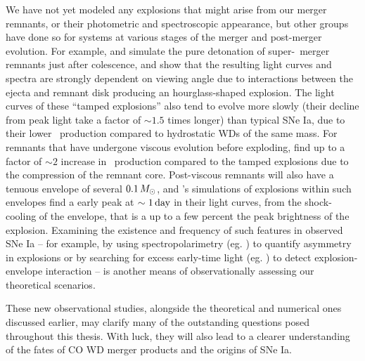 We have not yet modeled any explosions that might arise from our merger remnants, or their photometric and spectroscopic appearance, but other groups have done so for systems at various stages of the merger and post-merger evolution.  For example, \cite{rask+14} and \cite{vros+15} simulate the pure detonation of super-\Mch\ merger remnants just after colescence, and show that the resulting light curves and spectra are strongly dependent on viewing angle due to interactions between the ejecta and remnant disk producing an hourglass-shaped explosion.  The light curves of these ``tamped explosions'' also tend to evolve more slowly (their decline from peak light take a factor of $\sim1.5$ times longer) than typical SNe Ia, due to their lower \Ni\ production compared to hydrostatic WDs of the same mass.  For remnants that have undergone viscous evolution before exploding, \cite{rask+14} find up to a factor of $\sim2$ increase in \Ni\ production compared to the tamped explosions due to the compression of the remnant core.  Post-viscous remnants will also have a tenuous envelope of several $0.1\,\Msun$, and \cite{pirom15}'s simulations of explosions within such envelopes find a early peak at $\sim1\,\mathrm{day}$ in their light curves, from the shock-cooling of the envelope, that is a up to a few percent the peak brightness of the explosion. Examining the existence and frequency of such features in observed SNe Ia -- for example, by using spectropolarimetry (eg. \citealt{bullsk15}) to quantify asymmetry in explosions or by  searching for excess early-time light (eg. \citealt{mari+16}) to detect explosion-envelope interaction -- is another means of observationally assessing our theoretical scenarios.

These new observational studies, alongside the theoretical and numerical ones discussed earlier, may clarify many of the outstanding questions posed throughout this thesis.  With luck, they will also lead to a clearer understanding of the fates of CO WD merger products and the origins of SNe Ia.



